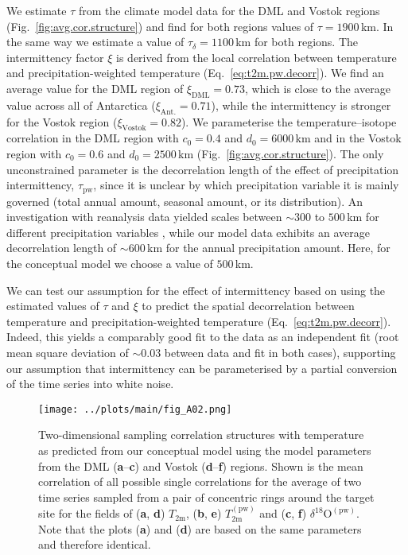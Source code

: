 \documentclass[cp, manuscript]{copernicus}
\begin{document}
We estimate $\tau$ from the climate model data for the DML and Vostok regions
(Fig.~\ref{fig:avg.cor.structure}) and find for both regions values of
$\tau=1900$\,km. In the same way we estimate a value of $\tau_{\delta}=1100$\,km
for both regions. The intermittency factor $\xi$ is derived from the local
correlation between temperature and precipitation-weighted temperature
(Eq.~\ref{eq:t2m.pw.decorr}). We find an average value for the DML region
of $\xi_{\mathrm{DML}}=0.73$, which is close to the average value across all of
Antarctica ($\xi_{\mathrm{Ant.}}=0.71$), while the intermittency is stronger for
the Vostok region ($\xi_{\mathrm{Vostok}}=0.82$). We parameterise the
temperature--isotope correlation in the DML region with $c_0=0.4$ and
$d_0=6000$\,km and in the Vostok region with $c_0=0.6$ and $d_0=2500$\,km
(Fig.~\ref{fig:avg.cor.structure}). The only unconstrained parameter is the
decorrelation length of the effect of precipitation intermittency,
$\tau_{\mathrm{pw}}$, since it is unclear by which precipitation variable it is
mainly governed (total annual amount, seasonal amount, or its distribution). An
investigation with reanalysis data yielded scales between $\sim300$ to $500$\,km
for different precipitation variables \citep{Munch2018a}, while our model data
exhibits an average decorrelation length of $\sim600$\,km for the annual
precipitation amount. Here, for the conceptual model we choose a value of
$500$\,km.

We can test our assumption for the effect of intermittency based on using the
estimated values of $\tau$ and $\xi$ to predict the spatial decorrelation
between temperature and precipitation-weighted temperature
(Eq.~\ref{eq:t2m.pw.decorr}). Indeed, this yields a comparably good fit to
the data as an independent fit (root mean square deviation of $\sim0.03$ between
data and fit in both cases), supporting our assumption that intermittency can be
parameterised by a partial conversion of the time series into white noise.

\begin{figure*}[t]%
\centering
\texttt{[image: ../plots/main/fig\_A02.png]}
\caption{%
  Two-dimensional sampling correlation structures with temperature as predicted
  from our conceptual model using the model parameters from the DML
  (\textbf{a}--\textbf{c}) and Vostok (\textbf{d}--\textbf{f}) regions. Shown is
  the mean correlation of all possible single correlations for the average of
  two time series sampled from a pair of concentric rings around the target site
  for the fields of (\textbf{a}, \textbf{d}) $T_{\mathrm{2m}}$, (\textbf{b},
  \textbf{e}) $T_{\mathrm{2m}}^{\mathrm{(pw)}}$ and (\textbf{c}, \textbf{f})
  $\delta^{18}\mathrm{O}^{\mathrm{(pw)}}$. Note that the plots (\textbf{a}) and
  (\textbf{d}) are based on the same parameters and therefore identical.}
\label{fig:conceptual.model}%
\end{figure*}%
\end{document}
